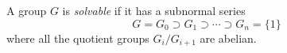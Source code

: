 \documentclass[12pt]{article}
\begin{document}
A group $G$ is {\em solvable} if it has a subnormal series
$$
G = G_0 \supset G_1 \supset \cdots \supset G_n = \{1\}
$$
where all the quotient groups $G_i/G_{i+1}$ are abelian.
\end{document}
